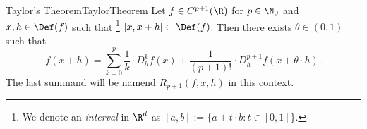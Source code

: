 \begin{msat}{Taylor's Theorem}{TaylorTheorem}
    Let $f\in C^{p+1}(\R)$ for $p\in\N_0$ and $x,h\in\Def(f)$ such that%
    \footnote{We denote an \emph{interval} in $\R^d$ as $[a,b]:=\{a + t\cdot b:t\in[0,1]\}$.} 
    $[x,x+h]\subset\Def(f)$. Then there exists $\theta\in(0,1)$ such that
    \[
        f(x + h) = \sum_{k=0}^p\frac{1}{k}\cdot D_h^k f(x) + \frac{1}{(p+1)!}\cdot D_h^{p+1}f(x + \theta\cdot h).
    \]
    The last summand will be namend $R_{p+1}(f,x,h)$ in this context.
\end{msat}